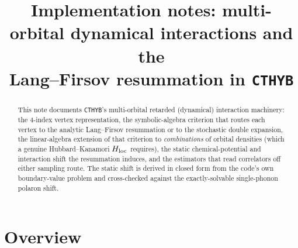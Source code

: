 \documentclass[a4paper,12pt]{article}
\newcommand{\Hloc}{\ensuremath{H_{\rm loc}}}
\begin{document}
\title{Implementation notes: multi-orbital dynamical interactions and the\\
Lang--Firsov resummation in \texttt{CTHYB}}
\maketitle

\begin{abstract}
This note documents \texttt{CTHYB}'s multi-orbital retarded (dynamical) interaction
machinery: the 4-index vertex representation, the symbolic-algebra criterion that routes
each vertex to the analytic Lang--Firsov resummation or to the stochastic double
expansion, the linear-algebra extension of that criterion to \emph{combinations} of
orbital densities (which a genuine Hubbard--Kanamori $\Hloc$ requires), the static
chemical-potential and interaction shift the resummation induces, and the estimators that
read correlators off either sampling route. The static shift is derived in closed form
from the code's own boundary-value problem and cross-checked against the exactly-solvable
single-phonon polaron shift.
\end{abstract}

\tableofcontents

\section{Overview}
\end{document}

